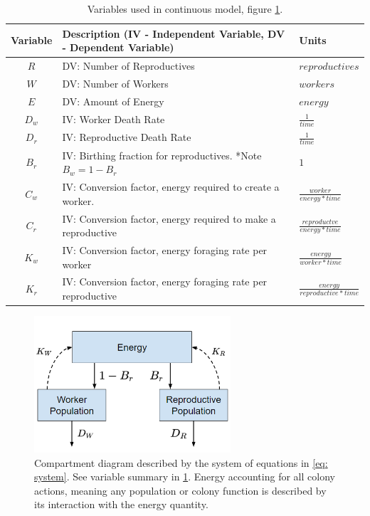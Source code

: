 \documentclass[12pt]{report}
\begin{document}
\begin{table}
 \begin{tabular}{||c l l |}
 \hline
 
 Variable & Description (IV - Independent Variable, DV - Dependent Variable) & Units  \\ [0.5ex] 
 \hline\hline
 $R$  & DV: Number of Reproductives 			& $reproductives$ \\  [5pt]
 $W$ & DV: Number of Workers    					& $workers$ \\ [5pt]
 $E$  & DV: Amount of Energy 							& $energy$ \\  [5pt]
 $D_w$& IV: Worker Death Rate 							& $\frac{1}{time}$  \\   [5pt]
 $D_r$ & IV: Reproductive Death Rate 				& $\frac{1}{time}$   \\  [5pt]
 $B_r$ & IV: Birthing fraction for reproductives.  *Note $B_w = 1-B_r$  & $1$  \\  [5pt]
 $C_w$& IV: Conversion factor, energy required to create a worker. & $\frac{worker}{energy * time}$ \\  [5pt]
 $C_r$ & IV: Conversion factor, energy required to make a reproductive & $\frac{reproductve}{energy * time}$ \\ 
 $K_w$& IV: Conversion factor, energy foraging rate per worker & $\frac{energy}{worker * time}$ \\  [5pt]
 $K_r$ & IV: Conversion factor, energy foraging rate per reproductive & $\frac{energy}{reproductive * time}$ \\  [5pt] \hline
\end{tabular}
\label{table: variables}
\caption{Variables used in continuous model, figure \ref{fig: Compartment Diagram}.}
\end{table}


\begin{figure}
	\centering
    \includegraphics[width=0.65\textwidth]{compartmentdiagram.png}
    \caption{Compartment diagram described by the system of equations in \ref{eq: system}.  See variable summary in \ref{table: variables}. Energy accounting for all colony actions, meaning any population or colony function is described by its interaction with the energy quantity. }
    \label{fig: Compartment Diagram}
\end{figure}
\end{document}
